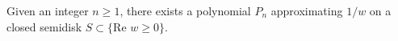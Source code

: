 
Given an integer $n \geq 1$, there exists a polynomial $P_n$ approximating $1/w$ on a closed semidisk $S \subset \{\text{Re } w \geq 0\}$.
